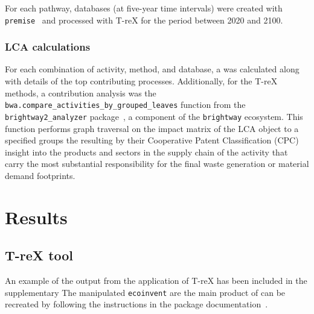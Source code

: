 \documentclass[a4paper,fleqn]{cas-dc}
\begin{document}
For each pathway, databases (at five-year time intervals) were created with
\texttt{premise}~\citep{sacchi2022premise} and processed with T-reX for the
period between 2020 and 2100.

\subsubsection{LCA calculations}
For each combination of activity, method, and database, a \protect{} \protect{} was
calculated along with details of the top contributing processes. Additionally,
for the T-reX methods, a contribution analysis was \protect{} \protect{} the
\texttt{bwa.compare\_activities\_by\_grouped\_leaves} function from the
\texttt{brightway2\_analyzer} package~\citep{mutel2016brightway2analyzer}, a
component of the \texttt{brightway} ecosystem. This function performs \protect{} graph traversal on the impact matrix of the LCA object to
a specified \protect{} \protect{} groups \protect{} the resulting \protect{} \protect{} by their
Cooperative Patent Classification (CPC) \protect{} \protect{} insight into the products and sectors in the supply
chain of the activity that carry the most substantial responsibility for the
final waste generation or material demand footprints.



\section{Results}\label{sec:results}
\subsection{T-reX tool}\label{sec:results-T-reX}

An example of the output from the application of T-reX has been included in the
supplementary \protect{} \protect{} The
manipulated \texttt{ecoinvent} \protect{} \protect{} are the main product of \protect{} \protect{}
can be recreated by following the instructions in the package
documentation~\citep{mcdowall2023T-reXdocs}.
\end{document}
